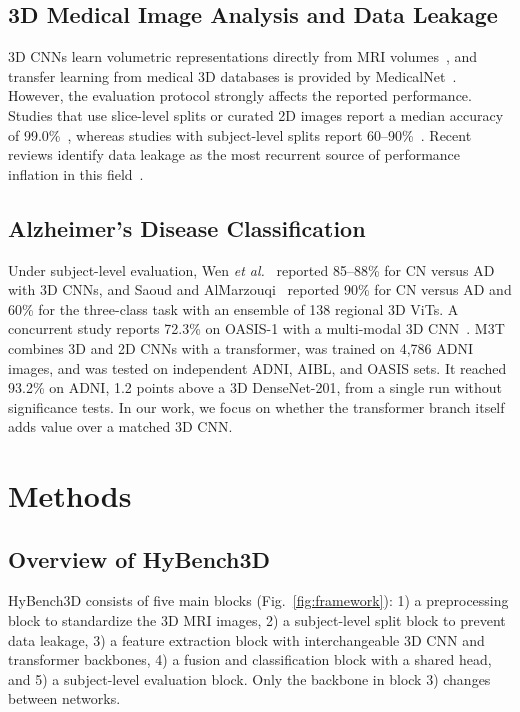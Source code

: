 \documentclass[conference,a4paper]{IEEEtran}
\begin{document}
\subsection{3D Medical Image Analysis and Data Leakage}
3D CNNs learn volumetric representations directly from MRI volumes~\cite{backstrom2018efficient}, and transfer learning from medical 3D databases is provided by MedicalNet~\cite{chen2019med3d}. However, the evaluation protocol strongly affects the reported performance. Studies that use slice-level splits or curated 2D images report a median accuracy of 99.0\%~\cite{alshayeji2024alzheimer,mahim2024unlocking,el2024novel,alsaeed2022brain,mora2023classification,kurniasari2024transforming,velu2025design,pandey2025leveraging}, whereas studies with subject-level splits report 60--90\%~\cite{wen2020convolutional,saoud2024explainable}. Recent reviews identify data leakage as the most recurrent source of performance inflation in this field~\cite{young2025leakage}.


\subsection{Alzheimer's Disease Classification}
Under subject-level evaluation, Wen \textit{et al.}~\cite{wen2020convolutional} reported 85--88\% for CN versus AD with 3D CNNs, and Saoud and AlMarzouqi~\cite{saoud2024explainable} reported 90\% for CN versus AD and 60\% for the three-class task with an ensemble of 138 regional 3D ViTs. A concurrent study reports 72.3\% on OASIS-1 with a multi-modal 3D CNN~\cite{sifat2026leakage}. M3T~\cite{jang2022m3t} combines 3D and 2D CNNs with a transformer, was trained on 4{,}786 ADNI images, and was tested on independent ADNI, AIBL, and OASIS sets. It reached 93.2\% on ADNI, 1.2 points above a 3D DenseNet-201, from a single run without significance tests. In our work, we focus on whether the transformer branch itself adds value over a matched 3D CNN.

\section{Methods}
\subsection{Overview of HyBench3D}
HyBench3D consists of five main blocks (Fig.~\ref{fig:framework}): 1) a preprocessing block to standardize the 3D MRI images, 2) a subject-level split block to prevent data leakage, 3) a feature extraction block with interchangeable 3D CNN and transformer backbones, 4) a fusion and classification block with a shared head, and 5) a subject-level evaluation block. Only the backbone in block 3) changes between networks.
\end{document}

